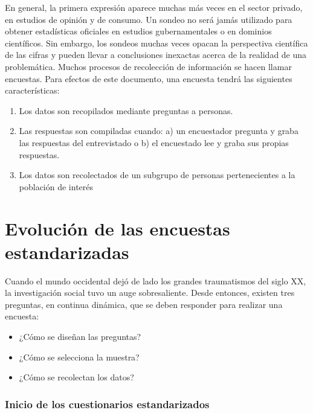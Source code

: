 \documentclass[
  10pt,
  spanish,
]{book}
\providecommand{\tightlist}{%
  \setlength{\itemsep}{0pt}\setlength{\parskip}{0pt}}
\begin{document}
En general, la primera expresión aparece muchas más veces en el sector privado, en estudios de opinión y de consumo. Un sondeo no será jamás utilizado para obtener estadísticas oficiales en estudios gubernamentales o en dominios científicos. Sin embargo, los sondeos muchas veces opacan la perspectiva científica de las cifras y pueden llevar a conclusiones inexactas acerca de la realidad de una problemática. Muchos procesos de recolección de información se hacen llamar encuestas. Para efectos de este documento, una encuesta tendrá las siguientes características:

\begin{enumerate}
\def\labelenumi{\arabic{enumi}.}
\tightlist
\item
  Los datos son recopilados mediante preguntas a personas.
\item
  Las respuestas son compiladas cuando: a) un encuestador pregunta y graba las respuestas del entrevistado o b) el encuestado lee y graba sus propias respuestas.
\item
  Los datos son recolectados de un subgrupo de personas pertenecientes a la población de interés
\end{enumerate}

\hypertarget{evoluciuxf3n-de-las-encuestas-estandarizadas}{%
\section{Evolución de las encuestas estandarizadas}\label{evoluciuxf3n-de-las-encuestas-estandarizadas}}

Cuando el mundo occidental dejó de lado los grandes traumatismos del siglo XX, la investigación social tuvo un auge sobresaliente. Desde entonces, existen tres preguntas, en continua dinámica, que se deben responder para realizar una encuesta:

\begin{itemize}
\tightlist
\item
  ¿Cómo se diseñan las preguntas?
\item
  ¿Cómo se selecciona la muestra?
\item
  ¿Cómo se recolectan los datos?
\end{itemize}

\hypertarget{inicio-de-los-cuestionarios-estandarizados}{%
\subsubsection*{Inicio de los cuestionarios estandarizados}\label{inicio-de-los-cuestionarios-estandarizados}}
\end{document}
